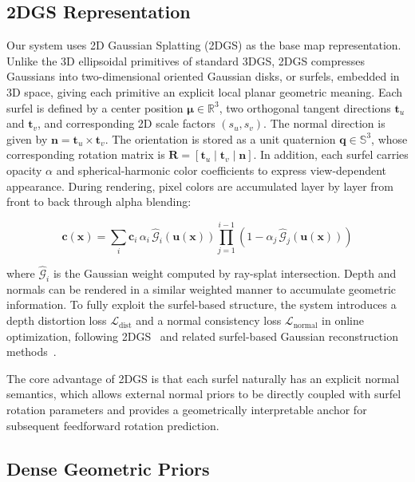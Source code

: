 \documentclass[lettersize,journal]{IEEEtran}
\begin{document}
\subsection{2DGS Representation}

Our system uses 2D Gaussian Splatting (2DGS) as the base map representation. Unlike the 3D ellipsoidal primitives of standard 3DGS, 2DGS compresses Gaussians into two-dimensional oriented Gaussian disks, or surfels, embedded in 3D space, giving each primitive an explicit local planar geometric meaning. Each surfel is defined by a center position $\boldsymbol{\mu} \in \mathbb{R}^3$, two orthogonal tangent directions $\mathbf{t}_u$ and $\mathbf{t}_v$, and corresponding 2D scale factors $(s_u, s_v)$. The normal direction is given by $\mathbf{n} = \mathbf{t}_u \times \mathbf{t}_v$. The orientation is stored as a unit quaternion $\mathbf{q} \in \mathbb{S}^3$, whose corresponding rotation matrix is $\mathbf{R} = [\mathbf{t}_u \mid \mathbf{t}_v \mid \mathbf{n}]$. In addition, each surfel carries opacity $\alpha$ and spherical-harmonic color coefficients to express view-dependent appearance. During rendering, pixel colors are accumulated layer by layer from front to back through alpha blending:

\begin{equation}
\mathbf{c}(\mathbf{x}) = \sum_{i} \mathbf{c}_i \, \alpha_i \, \hat{\mathcal{G}}_i(\mathbf{u}(\mathbf{x})) \prod_{j=1}^{i-1} \left(1 - \alpha_j \, \hat{\mathcal{G}}_j(\mathbf{u}(\mathbf{x}))\right)
\end{equation}

where $\hat{\mathcal{G}}_i$ is the Gaussian weight computed by ray-splat intersection. Depth and normals can be rendered in a similar weighted manner to accumulate geometric information. To fully exploit the surfel-based structure, the system introduces a depth distortion loss $\mathcal{L}_{\text{dist}}$ and a normal consistency loss $\mathcal{L}_{\text{normal}}$ in online optimization, following 2DGS~\cite{huang20242d} and related surfel-based Gaussian reconstruction methods~\cite{dai2024high,chen2024pgsr}.

The core advantage of 2DGS is that each surfel naturally has an explicit normal semantics, which allows external normal priors to be directly coupled with surfel rotation parameters and provides a geometrically interpretable anchor for subsequent feedforward rotation prediction.

\subsection{Dense Geometric Priors}
\end{document}
